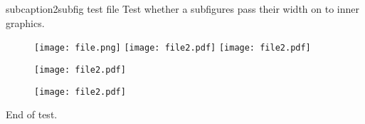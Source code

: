 subcaption2subfig test file
Test whether a subfigures pass their width on to inner graphics.

\begin{subfigure}[bt]{0.5\linewidth}
    \texttt{[image: file.png]}
    \texttt{[image: file2.pdf]}
    \texttt{[image: file2.pdf]}
\end{subfigure}

\begin{subfigure}[bt]{\linewidth}
    \texttt{[image: file2.pdf]}
\end{subfigure}

\begin{subfigure}[bt]{0.5\pagewidth}
    \texttt{[image: file2.pdf]}
\end{subfigure}

End of test.
